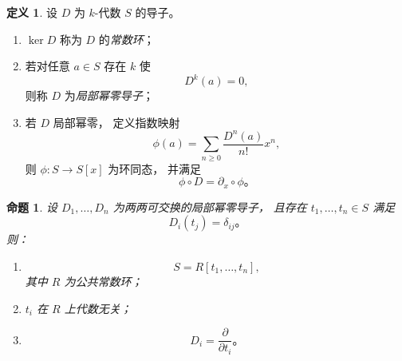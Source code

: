 \documentclass[11pt]{article}
\theoremstyle{plain}
\newtheorem{proposition}[theorem]{命题}
\theoremstyle{definition}
\newtheorem{definition}[theorem]{定义}
\theoremstyle{remark}
\begin{document}
\begin{definition}
    设 $D$ 为 $k$-代数 $S$ 的导子。

    \begin{enumerate}
        \item
              $\ker D$ 称为 $D$ 的\emph{常数环}；

        \item
              若对任意 $a\in S$
              存在 $k$ 使
              \[
                  D^k(a)=0,
              \]
              则称 $D$ 为\emph{局部幂零导子}；

        \item
              若 $D$ 局部幂零，
              定义指数映射
              \[
                  \phi(a)=
                  \sum_{n\ge0}
                  \frac{D^n(a)}{n!}x^n,
              \]
              则 $\phi:S\to S[x]$
              为环同态，
              并满足
              \[
                  \phi\circ D=\partial_x\circ\phi。
              \]
    \end{enumerate}
\end{definition}
\begin{proposition}
    设
    $D_1,\dots,D_n$
    为两两可交换的局部幂零导子，
    且存在
    $t_1,\dots,t_n\in S$
    满足
    \[
        D_i(t_j)=\delta_{ij}。
    \]
    则：

    \begin{enumerate}
        \item
              \[
                  S=R[t_1,\dots,t_n],
              \]
              其中 $R$ 为公共常数环；

        \item
              $t_i$ 在 $R$ 上代数无关；

        \item
              \[
                  D_i=\frac{\partial}{\partial t_i}。
              \]
    \end{enumerate}
\end{proposition}
\end{document}
